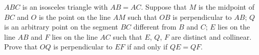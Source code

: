 
\begin{exercise}[2/1994]
    $ABC$ is an isosceles triangle with $AB = AC$.
    Suppose that $M$ is the midpoint of $BC$ and $O$ is the point on the line $AM$ such that $OB$ is perpendicular to $AB$; $Q$ is an arbitrary point on the segment $BC$ different from $B$ and $C$; $E$ lies on the line $AB$ and $F$ lies on the line $AC$ such that $E$, $Q$, $F$ are distinct and collinear.
    Prove that $OQ$ is perpendicular to $EF$ if and only if $QE = QF$.
\end{exercise}
